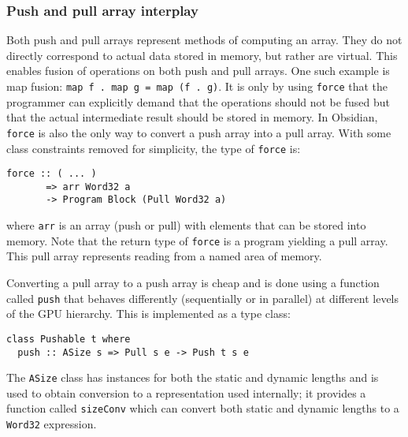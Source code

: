 \subsubsection{Push and pull array interplay} 
\label{sec:interplay}

Both push and pull arrays represent methods of computing an array. They 
do not directly correspond to actual data stored in memory, but rather 
are virtual. This enables fusion of operations on both push and pull arrays. 
One such example is map fusion: \verb!map f . map g = map (f . g)!. It is 
only by using {\tt force} that the programmer can explicitly demand that the 
operations should not be fused but that the actual intermediate result should 
be stored in memory. In Obsidian, {\tt force} is also the only way 
to convert a push array into a pull array. 
With some class constraints removed for simplicity, the type of {\tt force} is: 
\begin{small} 
\begin{Verbatim}[samepage=true] 
force :: ( ... ) 
       => arr Word32 a 
       -> Program Block (Pull Word32 a)
\end{Verbatim}
\end{small}

\noindent
where {\tt arr} is an array (push or pull) with elements that can be stored into memory. 
Note that the return type of {\tt force} is a program yielding a pull array. This pull 
array represents reading from a named area of memory. 

Converting a pull array to a push array is cheap and is done using a function called 
{\tt push} that behaves differently (sequentially or in parallel) at different levels
of the GPU hierarchy. This is implemented as a type class: 

\begin{small}
\begin{Verbatim}[samepage=true] 
class Pushable t where
  push :: ASize s => Pull s e -> Push t s e 
\end{Verbatim} 
\end{small}  

The {\tt ASize} class has instances for both the static and dynamic lengths 
and is used to obtain conversion to a representation used internally; it 
provides a function called {\tt sizeConv} which can convert both static and 
dynamic lengths to a {\tt Word32} expression.

